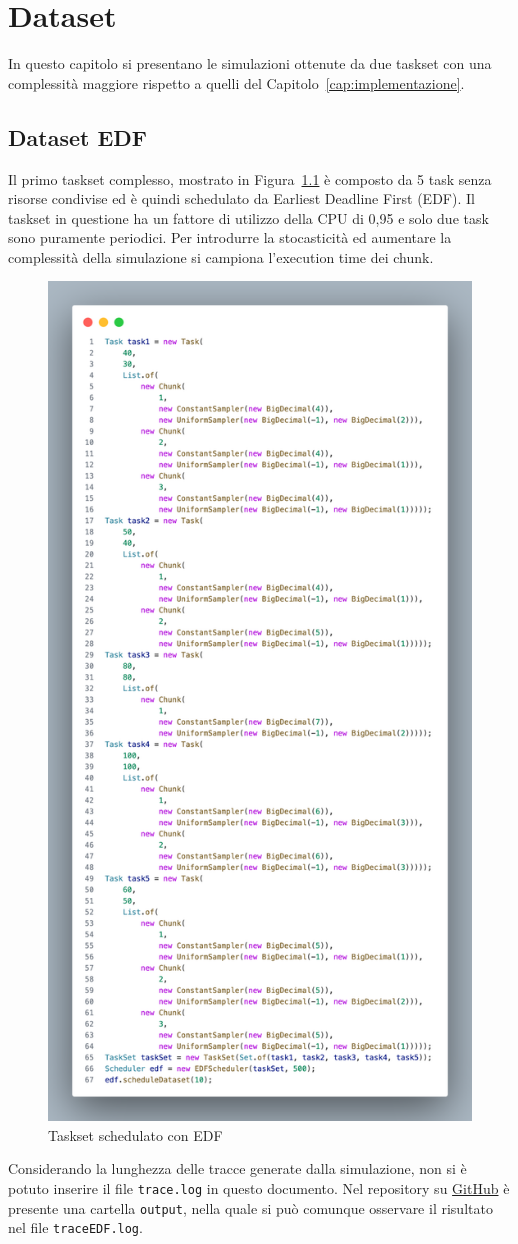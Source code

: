 \chapter{Dataset}
In questo capitolo si presentano le simulazioni ottenute da due taskset con una complessità maggiore rispetto a quelli del Capitolo~\ref{cap:implementazione}.

\section{Dataset EDF}
Il primo taskset complesso, mostrato in Figura~\ref{fig:dataset1} è composto da 5 task senza risorse condivise ed è quindi schedulato da Earliest Deadline First (EDF). Il taskset in questione ha un fattore di utilizzo della CPU di 0,95 e solo due task sono puramente periodici. Per introdurre la stocasticità ed aumentare la complessità della simulazione si campiona l'execution time dei chunk.

\begin{figure}[htbp]
\includegraphics[width=.4\textwidth]{immagini/datasetEDF.pdf}
\centering
\caption{Taskset schedulato con EDF}
\label{fig:dataset1}
\end{figure}

Considerando la lunghezza delle tracce generate dalla simulazione, non si è potuto inserire il file \texttt{trace.log} in questo documento. Nel repository su \href{https://github.com/edoardosarri24/real-time-scheduling-simulator.git}{GitHub} è presente una cartella \texttt{output}, nella quale si può comunque osservare il risultato nel file \texttt{traceEDF.log}.

